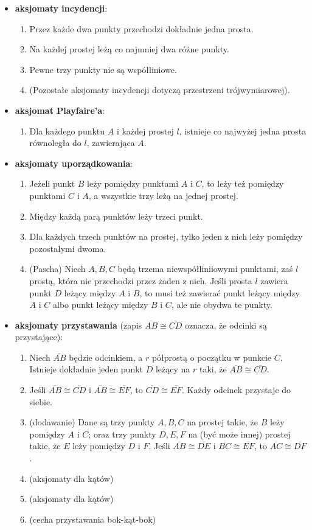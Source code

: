 {\begin{itemize}
	\item \textbf{aksjomaty incydencji}:
\begin{enumerate}
	\item Przez każde dwa punkty przechodzi dokładnie jedna prosta.
	\item Na każdej prostej leżą co najmniej dwa różne punkty.
	\item Pewne trzy punkty nie są współliniowe.
	\item (Pozostałe aksjomaty incydencji dotyczą przestrzeni trójwymiarowej).
\end{enumerate}
\item \textbf{aksjomat Playfaire'a}:
\begin{enumerate}
	\item Dla każdego punktu $A$ i każdej prostej $l$, istnieje co najwyżej jedna prosta równoległa do $l$, zawierająca $A$.
\end{enumerate}
\item \textbf{aksjomaty uporządkowania}: \begin{enumerate}
	\item Jeżeli punkt $B$ leży pomiędzy punktami $A$ i $C$, to leży też pomiędzy punktami $C$ i $A$, a wszystkie trzy leżą na jednej prostej.
	\item Między każdą parą punktów leży trzeci punkt.
	\item Dla każdych trzech punktów na prostej, tylko jeden z nich leży pomiędzy pozostałymi dwoma.
	\item (Pascha) Niech $A, B, C$ będą trzema niewspółliniiowymi punktami, zaś $l$ prostą, która nie przechodzi przez żaden z nich. Jeśli prosta $l$ zawiera punkt $D$ leżący między $A$ i $B$, to musi też zawierać punkt leżący między $A$ i $C$ albo punkt leżący między $B$ i $C$, ale nie obydwa te punkty.
\end{enumerate}
\item \textbf{aksjomaty przystawania} (zapis $\overline{AB} \cong \overline{CD}$ oznacza, że odcinki są przystające): \begin{enumerate}
	\item Niech $\overline{AB}$ będzie odcinkiem, a $r$ półprostą o początku w punkcie $C$. Istnieje dokładnie jeden punkt $D$ leżący na $r$ taki, że $\overline{AB} \cong \overline{CD}$.
	\item Jeśli $\overline{AB} \cong \overline{CD}$ i $\overline{AB} \cong \overline{EF}$, to $\overline{CD} \cong \overline{EF}$. Każdy odcinek przystaje do siebie.
	\item (dodawanie) Dane są trzy punkty $A, B, C$ na prostej takie, że $B$ leży pomiędzy $A$ i $C$; oraz trzy punkty $D, E, F$ na (być może innej) prostej takie, że $E$ leży pomiędzy $D$ i $F$.
	Jeśli $\overline{AB} \cong \overline{DE}$ i $\overline{BC} \cong \overline{EF}$, to $\overline{AC} \cong \overline{DF}$.
	\item (aksjomaty dla kątów)
	\item (aksjomaty dla kątów)
	\item (cecha przystawania bok-kąt-bok)
\end{enumerate}
\end{itemize}

}

